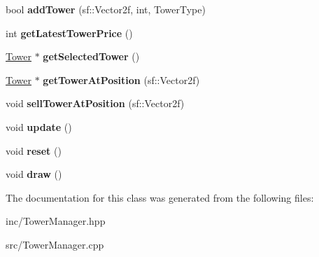 \begin{DoxyCompactItemize}
\item 
\hypertarget{class_tower_manager_aac24a3243c133b5cc7b3d911135adf39}{bool {\bfseries add\+Tower} (sf\+::\+Vector2f, int, Tower\+Type)}\label{class_tower_manager_aac24a3243c133b5cc7b3d911135adf39}

\item 
\hypertarget{class_tower_manager_a2a5ec0145347c22590e3e98be7987414}{int {\bfseries get\+Latest\+Tower\+Price} ()}\label{class_tower_manager_a2a5ec0145347c22590e3e98be7987414}

\item 
\hypertarget{class_tower_manager_a5de9775d08f9fc10e5438559afe3ff8f}{\hyperlink{class_tower}{Tower} $\ast$ {\bfseries get\+Selected\+Tower} ()}\label{class_tower_manager_a5de9775d08f9fc10e5438559afe3ff8f}

\item 
\hypertarget{class_tower_manager_a0340108a8ae5449f2362d057f21971ea}{\hyperlink{class_tower}{Tower} $\ast$ {\bfseries get\+Tower\+At\+Position} (sf\+::\+Vector2f)}\label{class_tower_manager_a0340108a8ae5449f2362d057f21971ea}

\item 
\hypertarget{class_tower_manager_a60b3a4b9fa749110d3ecdaa9b6e26199}{void {\bfseries sell\+Tower\+At\+Position} (sf\+::\+Vector2f)}\label{class_tower_manager_a60b3a4b9fa749110d3ecdaa9b6e26199}

\item 
\hypertarget{class_tower_manager_a378105e167be8e1748772fb5d5f0791b}{void {\bfseries update} ()}\label{class_tower_manager_a378105e167be8e1748772fb5d5f0791b}

\item 
\hypertarget{class_tower_manager_a84d0f78c6da0b82268e773cda27c48b9}{void {\bfseries reset} ()}\label{class_tower_manager_a84d0f78c6da0b82268e773cda27c48b9}

\item 
\hypertarget{class_tower_manager_a5e0d703a34c74992db261ae9a8c3da1c}{void {\bfseries draw} ()}\label{class_tower_manager_a5e0d703a34c74992db261ae9a8c3da1c}

\end{DoxyCompactItemize}


The documentation for this class was generated from the following files\+:\begin{DoxyCompactItemize}
\item 
inc/Tower\+Manager.\+hpp\item 
src/Tower\+Manager.\+cpp\end{DoxyCompactItemize}
